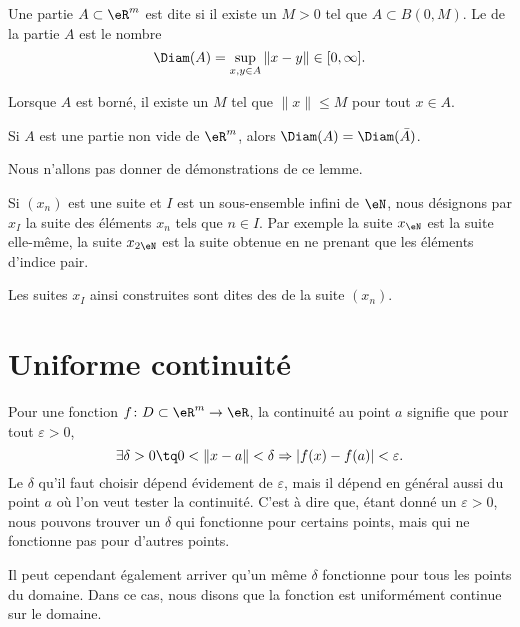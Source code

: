 \begin{definition}
	Une partie $A\subset\eR^m$ est dite  si il existe un $M>0$ tel que $A\subset B(0,M)$. Le  de la partie $A$ est le nombre
	\begin{equation}
		\Diam(A)=\sup_{x,y\in A}\| x-y \|\in\mathopen[ 0 , \infty \mathclose].
	\end{equation}
\end{definition}
Lorsque $A$ est borné, il existe un $M$ tel que $\| x \|\leq M$ pour tout $x\in A$.

\begin{lemma}
	Si $A$ est une partie non vide de $\eR^m$, alors $\Diam(A)=\Diam(\bar A)$.
\end{lemma}
Nous n'allons pas donner de démonstrations de ce lemme.


Si $(x_n)$ est une suite et $I$ est un sous-ensemble infini de $\eN$, nous désignons par $x_I$ la suite des éléments $x_n$ tels que $n\in I$. Par exemple la suite $x_{\eN}$ est la suite elle-même, la suite $x_{2\eN}$ est la suite obtenue en ne prenant que les éléments d'indice pair.

Les suites $x_I$ ainsi construites sont dites des  de la suite $(x_n)$.


\section{Uniforme continuité}		\label{SecUnifContinue}

Pour une fonction $f\colon D\subset\eR^m\to \eR$, la continuité au point $a$ signifie que pour tout $\varepsilon>0$,
\begin{equation}
	\exists\delta>0\tq 0<\| x-a \|<\delta\Rightarrow | f(x)-f(a) |<\varepsilon.
\end{equation}
Le $\delta$ qu'il faut choisir dépend évidement de $\varepsilon$, mais il dépend en général aussi du point $a$ où l'on veut tester la continuité. C'est à dire que, étant donné un $\varepsilon>0$, nous pouvons trouver un $\delta$ qui fonctionne pour certains points, mais qui ne fonctionne pas pour d'autres points.

Il peut cependant également arriver qu'un même $\delta$ fonctionne pour tous les points du domaine. Dans ce cas, nous disons que la fonction est uniformément continue sur le domaine.

